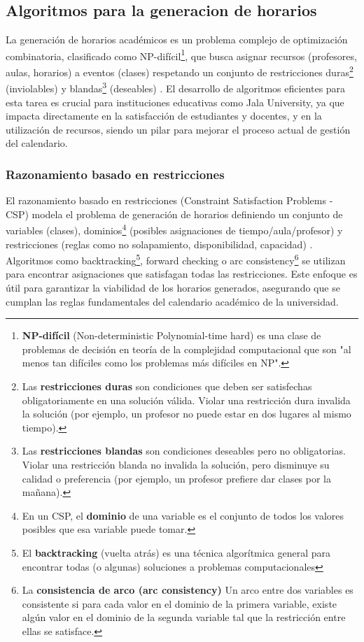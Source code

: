 \subsection{Algoritmos para la generacion de horarios}
La generación de horarios académicos es un problema complejo de optimización combinatoria, clasificado como NP-difícil\footnote{\textbf{NP-difícil} (Non-deterministic Polynomial-time hard) es una clase de problemas de decisión en teoría de la complejidad computacional que son "al menos tan difíciles como los problemas más difíciles en NP".}, que busca asignar recursos (profesores, aulas, horarios) a eventos (clases) respetando un conjunto de restricciones duras\footnote{Las \textbf{restricciones duras} son condiciones que deben ser satisfechas obligatoriamente en una solución válida.
Violar una restricción dura invalida la solución (por ejemplo, un profesor no puede estar en dos lugares al mismo tiempo).} (inviolables) y blandas\footnote{Las \textbf{restricciones blandas} son condiciones deseables pero no obligatorias.
Violar una restricción blanda no invalida la solución, pero disminuye su calidad o preferencia (por ejemplo, un profesor prefiere dar clases por la mañana).} (deseables) \parencite{Schaerf1999}.
El desarrollo de algoritmos eficientes para esta tarea es crucial para instituciones educativas como Jala University, ya que impacta directamente en la satisfacción de estudiantes y docentes, y en la utilización de recursos, siendo un pilar para mejorar el proceso actual de gestión del calendario.

\subsubsection{Razonamiento basado en restricciones}
El razonamiento basado en restricciones (Constraint Satisfaction Problems - CSP) modela el problema de generación de horarios definiendo un conjunto de variables (clases), dominios\footnote{En un CSP, el \textbf{dominio} de una variable es el conjunto de todos los valores posibles que esa variable puede tomar.} (posibles asignaciones de tiempo/aula/profesor) y restricciones (reglas como no solapamiento, disponibilidad, capacidad) \parencite{Rossi2006}.
Algoritmos como backtracking\footnote{El \textbf{backtracking} (vuelta atrás) es una técnica algorítmica general para encontrar todas (o algunas) soluciones a problemas computacionales}, forward checking o arc consistency\footnote{La \textbf{consistencia de arco (arc consistency)} Un arco entre dos variables es consistente si para cada valor en el dominio de la primera variable, existe algún valor en el dominio de la segunda variable tal que la restricción entre ellas se satisface.} se utilizan para encontrar asignaciones que satisfagan todas las restricciones.
Este enfoque es útil para garantizar la viabilidad de los horarios generados, asegurando que se cumplan las reglas fundamentales del calendario académico de la universidad.

